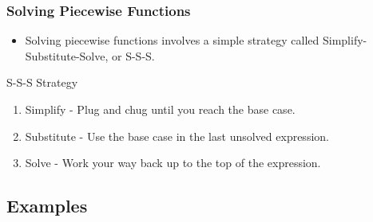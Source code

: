 \documentclass[fleqn, t]{beamer}
\begin{document}
\begin{frame}
  \frametitle{Solving Piecewise Functions}
  \begin{itemize}[<+->]
  \item Solving piecewise functions involves a simple strategy called
    Simplify-Substitute-Solve, or S-S-S. 
  \end{itemize}
  \begin{block}{S-S-S Strategy}
    \begin{enumerate}[<+->]
    \item Simplify - Plug and chug until you reach the base case. 
    \item Substitute - Use the base case in the last unsolved expression. 
    \item Solve - Work your way back up to the top of the expression.
    \end{enumerate}
  \end{block}
  \begin{figure}
  \end{figure}
\end{frame}

\subsection{Examples}
\end{document}
